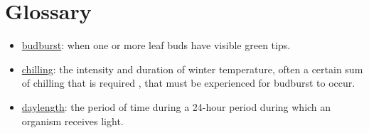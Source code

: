 \documentclass{article}
\begin{document}
\section* {Glossary}
\begin{itemize}
\item \underline{budburst}: when one or more leaf buds have visible green tips. 
\item \underline{chilling}: the intensity and duration of winter temperature, often a certain sum of chilling that is required \citep[e.g., some amount of hours or days of cold temperatures, defined by a specific critical temperature or range of temperatures, such as between 0 and 7.2 \degree C,][]{richardson1974}, that must be experienced for budburst to occur.
\item \underline{daylength}: the period of time during a 24-hour period during which an organism receives light.


\end{itemize}
\end{document}
